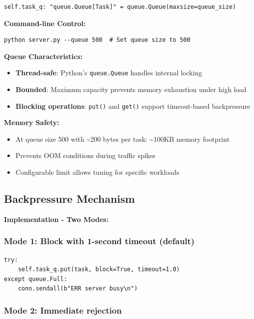 \documentclass[12pt]{article}
\begin{document}
\begin{lstlisting}
self.task_q: "queue.Queue[Task]" = queue.Queue(maxsize=queue_size)
\end{lstlisting}

\textbf{Command-line Control:}
\begin{verbatim}
python server.py --queue 500  # Set queue size to 500
\end{verbatim}

\textbf{Queue Characteristics:}

\begin{itemize}
    \item \textbf{Thread-safe}: Python's \texttt{queue.Queue} handles internal locking
    \item \textbf{Bounded}: Maximum capacity prevents memory exhaustion under high load
    \item \textbf{Blocking operations}: \texttt{put()} and \texttt{get()} support timeout-based backpressure
\end{itemize}

\textbf{Memory Safety:}
\begin{itemize}
    \item At queue size 500 with \textasciitilde200 bytes per task: \textasciitilde100KB memory footprint
    \item Prevents OOM conditions during traffic spikes
    \item Configurable limit allows tuning for specific workloads
\end{itemize}

\subsection{Backpressure Mechanism}

\textbf{Implementation - Two Modes:}

\subsubsection{Mode 1: Block with 1-second timeout (default)}

\begin{lstlisting}
try:
    self.task_q.put(task, block=True, timeout=1.0)
except queue.Full:
    conn.sendall(b"ERR server busy\n")
\end{lstlisting}

\subsubsection{Mode 2: Immediate rejection}
\end{document}
